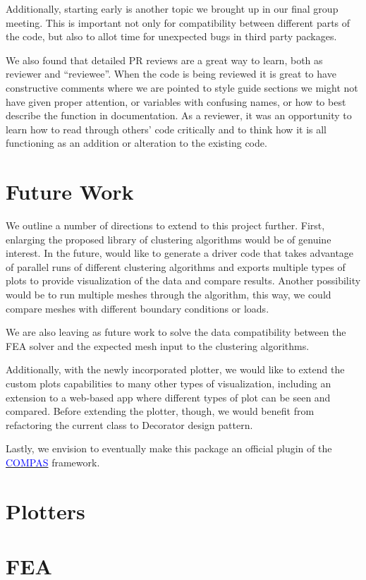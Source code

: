\documentclass[11pt]{article}
\begin{document}
Additionally, starting early is another topic we brought up in our final group meeting. This is important not only for compatibility between different parts of the code, but also to allot time for unexpected bugs in third party packages.

We also found that detailed PR reviews are a great way to learn, both as reviewer and “reviewee”. When the code is being reviewed it is great to have constructive comments where we are pointed to style guide sections we might not have given proper attention, or variables with confusing names, or how to best describe the function in documentation. As a reviewer, it was an opportunity to learn how to read through others’ code critically and to think how it is all functioning as an addition or alteration to the existing code.


\section{Future Work}

We outline a number of directions to extend to this project further. First, enlarging the proposed library of clustering algorithms would be of genuine interest. In the future, would like to generate a driver code that takes advantage of parallel runs of different clustering algorithms and exports multiple types of plots to provide visualization of the data and compare results. Another possibility would be to run multiple meshes through the algorithm, this way, we could compare meshes with different boundary conditions or loads.

We are also leaving as future work to solve the data compatibility between the FEA solver and the expected mesh input to the clustering algorithms. 

Additionally, with the newly incorporated plotter, we would like to extend the custom plots capabilities to many other types of visualization, including an extension to a web-based app where different types of plot can be seen and compared.
Before extending the plotter, though, we would benefit from refactoring the current class to Decorator design pattern. 

Lastly, we envision to eventually make this package an official plugin of the \href{http://www.compas.dev}{\textcolor{blue}{COMPAS}} framework.


\clearpage
\appendix

\section{Plotters}
\label{appendix:a}


\section{FEA}
\label{appendix:b}

\end{document}
